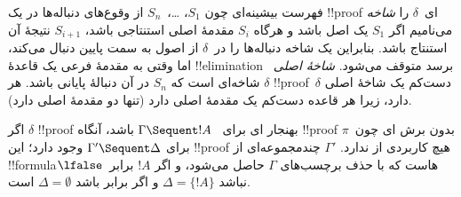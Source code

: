 \documentclass[../../../include/open-logic-section]{subfiles}
\begin{document}
فهرست بیشینه‌ای چون $S_1$، \dots،~$S_n$ از وقوع‌های دنباله‌ها در یک
!!{proof} ای~$\delta$ را \emph{شاخه} می‌نامیم اگر $S_1$ یک
اصل باشد و هرگاه $S_i$ مقدمهٔ اصلی استنتاجی باشد، $S_{i+1}$ نتیجهٔ آن
استنتاج باشد. بنابراین یک شاخه دنباله‌ها را در~$\delta$ از اصول به
سمت پایین دنبال می‌کند، اما وقتی به مقدمهٔ فرعی یک قاعدهٔ
!!{elimination} برسد متوقف می‌شود. \emph{شاخهٔ اصلی}~$\delta$ شاخه‌ای
است که $S_n$ در آن دنبالهٔ پایانی باشد. هر !!{proof}~$\delta$ دست‌کم
یک شاخهٔ اصلی دارد، زیرا هر قاعده دست‌کم یک مقدمهٔ اصلی دارد (تنها
\Intro{\land} دو مقدمهٔ اصلی دارد).


\begin{prop}
اگر $\delta$ !!{proof} بهنجار ای برای
~$\Gamma \Sequent !A$ باشد، آنگاه !!{proof} بدون برش
ای چون~$\pi$ برای $\Gamma' \Sequent \Delta$ وجود دارد؛ این
!!{proof} هیچ کاربردی از \Cut{} ندارد.
$\Gamma'$ چندمجموعه‌ای از !!{formula}هاست که با حذف برچسب‌های
$\Gamma$ حاصل می‌شود، و اگر $!A$ برابر~$\lfalse$ نباشد
$\Delta = \{!A\}$ و اگر برابر باشد $\Delta = \emptyset$ است.
\end{prop}
\end{document}
